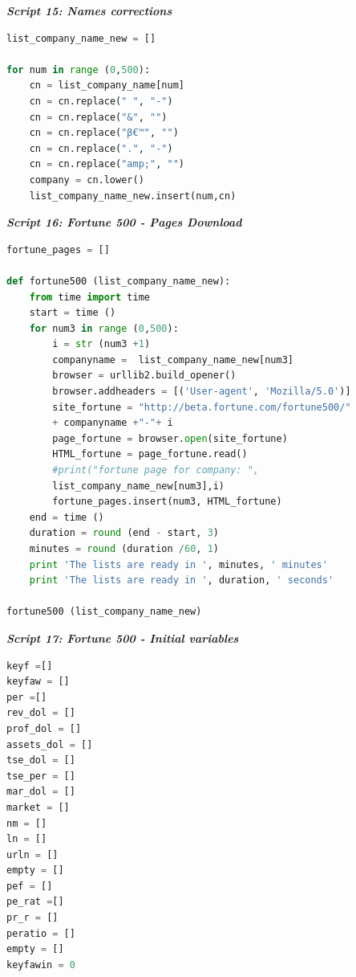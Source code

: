 \documentclass{book}
\begin{document}
\begin{center}
\textit{\textbf{Script 15: Names corrections}}\label{p18}
\end{center}
\begin{lstlisting}[language=Python]
list_company_name_new = []

for num in range (0,500):
    cn = list_company_name[num]
    cn = cn.replace(" ", "-")
    cn = cn.replace("&", "")
    cn = cn.replace("β€™", "")
    cn = cn.replace(".", "-")
    cn = cn.replace("amp;", "")    
    company = cn.lower()
    list_company_name_new.insert(num,cn)
\end{lstlisting}     

\begin{center}
\textit{\textbf{Script 16: Fortune 500 - Pages Download}}\label{p19}
\end{center}
\begin{lstlisting}[language=Python] 
fortune_pages = []

def fortune500 (list_company_name_new):
    from time import time  
    start = time ()
    for num3 in range (0,500):
        i = str (num3 +1)    
        companyname =  list_company_name_new[num3]
        browser = urllib2.build_opener() 
        browser.addheaders = [('User-agent', 'Mozilla/5.0')]
        site_fortune = "http://beta.fortune.com/fortune500/"
        + companyname +"-"+ i    
        page_fortune = browser.open(site_fortune)
        HTML_fortune = page_fortune.read()    
        #print("fortune page for company: ", 
        list_company_name_new[num3],i)
        fortune_pages.insert(num3, HTML_fortune)
    end = time ()
    duration = round (end - start, 3)
    minutes = round (duration /60, 1)
    print 'The lists are ready in ', minutes, ' minutes'
    print 'The lists are ready in ', duration, ' seconds'

fortune500 (list_company_name_new)
\end{lstlisting}    

\begin{center}
\textit{\textbf{Script 17: Fortune 500 - Initial variables}}\label{p20}
\end{center}
\begin{lstlisting}[language=Python] 
keyf =[]
keyfaw = []
per =[]
rev_dol = []
prof_dol = []
assets_dol = []
tse_dol = []
tse_per = []
mar_dol = []
market = []
nm = []
ln = []
urln = []
empty = []
pef = []
pe_rat =[]
pr_r = []
peratio = []
empty = []
keyfawin = 0
\end{lstlisting}  
\end{document}
